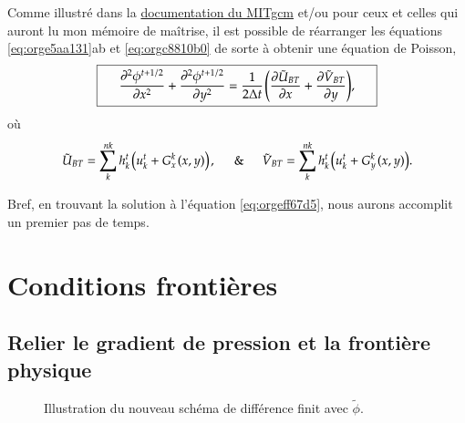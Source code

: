 \documentclass[10pt]{article}
\numberwithin{equation}{section}
\newcommand{\pt}{\hspace{1pt}}
\begin{document}
Comme illustré dans la \href{http://mitgcm.org/public/r2\_manual/final/online\_documents/node33.html}{documentation du MITgcm} et/ou pour ceux et celles qui auront lu mon mémoire de maîtrise, il est possible de réarranger les équations \ref{eq:orge5aa131}ab et \ref{eq:orgc8810b0} de sorte à obtenir une équation de Poisson,
\begin{equation}
\label{eq:orgeff67d5}
\boxed{\hspace{0.5cm} \pdv[2]{\phi^{t+1/2}}{x} + \pdv[2]{\phi^{t+1/2}}{y} = \frac{1}{2\Delta t}\pt \qty(\pdv{ \tilde{U}_{BT}}{x} + \pdv{\tilde{V}_{BT}}{y}),\hspace{0.5cm} }
\end{equation}
où
\begin{equation}
\tilde{U}_{BT} = \sum_k^{nk} h_k^t\pt \qty(u^t_k + G^k_x\pt(x,y))\pt,
\hspace{0.5cm}\&\hspace{0.5cm}
\tilde{V}_{BT} = \sum_k^{nk} h^t_k\pt \qty(u^t_k + G^k_y\pt(x,y)).
\end{equation}

Bref, en trouvant la solution à l'équation \ref{eq:orgeff67d5}, nous aurons accomplit un premier pas de temps. \newpage

\section{Conditions frontières}
\label{sec:org5437b14}

\subsection{Relier le gradient de pression et la frontière physique}
\label{sec:org00ac7a2}

\begin{wrapfigure}[13]{r}{0.35\textwidth}
\vspace{-\baselineskip}
\centering
{}
\caption{\label{orgfc09c2c}Illustration du nouveau schéma de différence finit avec \(\tilde{\phi}\).}
\end{wrapfigure}
\end{document}
